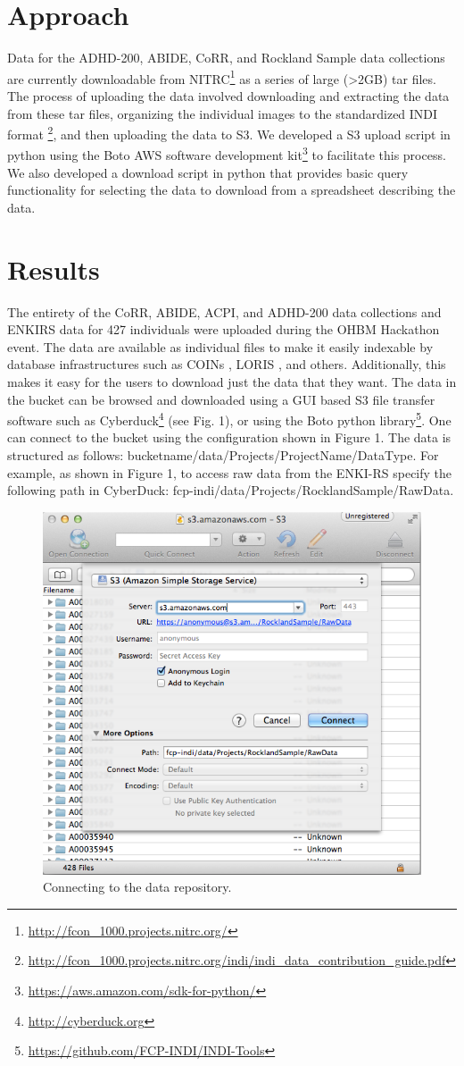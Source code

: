 \documentclass[twocolumn]{bmcart}%
\begin{document}
\section{Approach}\label{approach}

Data for the ADHD-200, ABIDE, CoRR, and Rockland Sample data collections
are currently downloadable from
NITRC\footnote{\url{http://fcon_1000.projects.nitrc.org/}} as a series
of large (\textgreater{}2GB) tar files. The process of uploading the
data involved downloading and extracting the data from these tar files,
organizing the individual images to the standardized INDI format
\footnote{\url{http://fcon_1000.projects.nitrc.org/indi/indi_data_contribution_guide.pdf}},
and then uploading the data to S3. We developed a S3 upload script in
python using the Boto AWS software development
kit\footnote{\url{https://aws.amazon.com/sdk-for-python/}} to facilitate
this process. We also developed a download script in python that
provides basic query functionality for selecting the data to download
from a spreadsheet describing the data.

\section{Results}\label{results}

The entirety of the CoRR, ABIDE, ACPI, and ADHD-200 data collections and
ENKIRS data for 427 individuals were uploaded during the OHBM Hackathon
event. The data are available as individual files to make it easily
indexable by database infrastructures such as COINs \cite{landis2016},
LORIS \cite{Das2011}, and others. Additionally, this makes it easy for
the users to download just the data that they want. The data in the
bucket can be browsed and downloaded using a GUI based S3 file transfer
software such as Cyberduck\footnote{\url{http://cyberduck.org}} (see
Fig. 1), or using the Boto python
library\footnote{\url{https://github.com/FCP-INDI/INDI-Tools}}. One can
connect to the bucket using the configuration shown in Figure 1. The
data is structured as follows:
bucketname/data/Projects/ProjectName/DataType. For example, as shown in
Figure 1, to access raw data from the ENKI-RS specify the following path
in CyberDuck: fcp-indi/data/Projects/RocklandSample/RawData.

\begin{figure}[h!]
  \includegraphics[width=.47\textwidth]{cyberduck_screenshot.png}
  \caption{\label{centfig} Connecting to the data repository.}
\end{figure}
\end{document}
